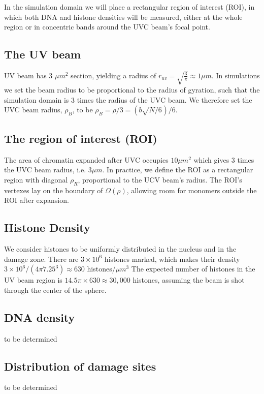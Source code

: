 \documentclass[12pt]{report}
\begin{document}
	In the simulation domain we will place a rectangular region of interest (ROI), in which both DNA and histone densities will be measured, either at the whole region or in concentric bands around the UVC beam's focal point. 
	
	\subsection{The UV beam}
	UV beam has 3 $\mu m^2$ section, yielding a radius of $r_{uv}=\sqrt{\frac{3}{\pi}}\approx 1 \mu m$. 
	In simulations we set the beam radius to be proportional to the radius of gyration, such that the simulation domain is 3 times the radius of the UVC beam. We therefore set the UVC beam radius, $\rho_B$, to be  
    $\rho_B=\rho/3=(b\sqrt{N/6})/6$.
	
	\subsection{The region of interest (ROI)}
     The area of chromatin expanded after UVC occupies $10 \mu m^2$ which gives 3 times the UVC beam radius, i.e. $3\mu m$. In practice, we define the ROI as a rectangular region with diagonal $\rho_R$, proportional to the UCV beam's radius. The ROI's vertexes lay on the boundary of $\Omega(\rho)$, allowing room for monomers outside the ROI after expansion. 
		
    \subsection{Histone Density}
		We consider histones to be uniformly distributed in the nucleus and in the damage zone. There are $3\times 10^6$ histones marked, which makes their density $3\times 10^6 /(4 \pi 7.25^3)\approx 630$ histones/$\mu m^3$
		The expected number of histones in the UV beam region is $14.5\pi \times 630\approx 30,000$ histones, assuming the beam is shot through the center of the sphere. 
    
    \subsection{DNA density}
	to be determined	
	
	\subsection{Distribution of damage sites}
	to be determined
	
				    
\end{document}
